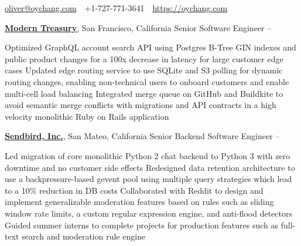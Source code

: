\documentclass[letterpaper,MMMyyyy,nonstopmode]{simpleresumecv}
\newcommand{\CVAuthor}{Oliver Chang}
\newcommand{\CVWebpage}{https://oychang.com}
\begin{document}

\Title{\CVAuthor}

\begin{SubTitle}
\href{mailto:oliver@oychang.com}{oliver@oychang.com}
\,\SubBulletSymbol\,
+1-727-771-3641
\,\SubBulletSymbol\,
\href{\CVWebpage}
{\url{\CVWebpage}}
\end{SubTitle}

\begin{Body}




\Entry
\href{https://www.moderntreasury.com}{\textbf{Modern Treasury}}, San Francisco, California
\Gap
\BulletItem Senior Software Engineer
\hfill {} -- 
\begin{Detail}
\SubBulletItem Optimized GraphQL account search API using Postgres B-Tree GIN indexes and public product changes for a 100x decrease in latency for large customer edge cases
\SubBulletItem Updated edge routing service to use SQLite and S3 polling for dynamic routing changes, enabling non-technical users to onboard customers and enable multi-cell load balancing
\SubBulletItem Integrated merge queue on GitHub and Buildkite to avoid semantic merge conflicts with migrations and API contracts in a high velocity monolithic Ruby on Rails application
\end{Detail}

\Entry
\href{https://www.sendbird.com/}{\textbf{Sendbird, Inc.}}, San Mateo, California
\Gap
\BulletItem Senior Backend Software Engineer
\hfill {} -- 
\begin{Detail}
\SubBulletItem Led migration of core monolithic Python 2 chat backend to Python 3 with zero downtime and no customer side effects
\SubBulletItem Redesigned data retention architecture to use a backpressure-based gevent pool using multiple query strategies which lead to a 10\% reduction in DB costs
\SubBulletItem Collaborated with Reddit to design and implement generalizable moderation features based on rules such as sliding window rate limits, a custom regular expression engine, and anti-flood detectors
\SubBulletItem Guided summer interns to complete projects for production features such as full-text search and moderation rule engine
\end{Detail}


\end{Body}
\end{document}
